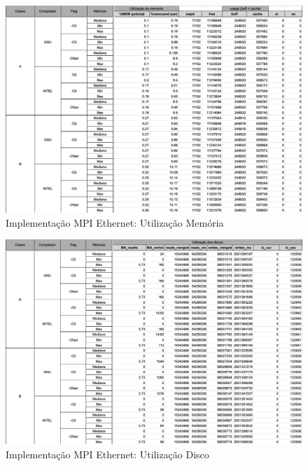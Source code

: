 \documentclass{article}
\begin{document}
\begin{appendices}
\begin{figure}[H]
    \centering
    \includegraphics[width=12cm]{Pictures/LUMZ_r431_MPIE_MEM.png}
    \caption{Implementação MPI Ethernet: Utilização Memória}
    \label{figure:LUMZ_r431_MPIE_MEM}
\end{figure}

\begin{figure}[H]
    \centering
    \includegraphics[width=12cm]{Pictures/LUMZ_r431_MPIE_DISK.png}
    \caption{Implementação MPI Ethernet: Utilização Disco}
    \label{figure:LUMZ_r431_MPIE_DISK}
\end{figure}


\end{appendices}
\end{document}
